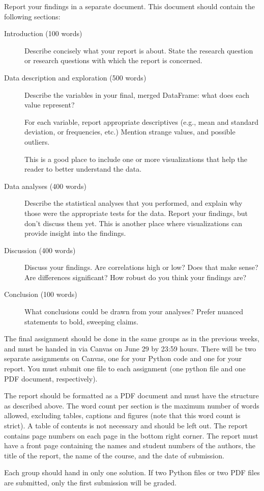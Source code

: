 \documentclass[a4paper]{report}
\theoremstyle{definition}
\newcommand{\blankline}{\par\vspace{5mm}}
\begin{document}
	Report your findings in a separate document. This document should contain
	the following sections:
	
	\begin{description}
		\item[Introduction (100 words)]
		Describe concisely what your report is about. State the research
		question
		or research questions with which the report is concerned.
		
		\item[Data description and exploration (500 words)]
		Describe the variables in your final, merged DataFrame: what does each
		value represent?
		
		For each variable, report appropriate descriptives (e.g., mean and
		standard deviation, or frequencies, etc.) Mention strange values, and
		possible outliers.
		
		This is a good place to include one or more visualizations that help the
		reader to better understand the data.
		
		\item[Data analyses (400 words)]
		
		Describe the statistical analyses that you performed, and explain why
		those were the appropriate tests for the data. Report your findings,
		but don't discuss them yet. This is another place where visualizations can provide insight into the findings.
		
		\item[Discussion (400 words)]
		
		Discuss your findings. Are correlations high or low? Does that make sense? Are differences significant? How robust do you think your findings are?
		
		\item[Conclusion (100 words)]
		
		What conclusions could be drawn from your analyses? Prefer nuanced statements to bold, sweeping claims.
		
	\end{description}
	
	The final assignment should be done in the same groups as in the previous weeks, and must be handed in via Canvas on June 29 by 23:59 hours. There will be two separate assignments on Canvas, one for your Python code and one for your report. You must submit one file to each assignment (one python file and one PDF document, respectively).
	\blankline
	The report should be formatted as a PDF document and must have the structure as described above. The word count per section is the maximum
	number of words allowed, excluding tables, captions and figures (note that this word count is strict). A table of contents is not necessary
	and should be left out. The report contains page numbers on each page in the bottom right corner. The report must have a front page containing
	the names and student numbers of the authors, the title of the report, the name of the course, and the date of submission.
	\blankline
	Each group should hand in only one solution. If two Python files or two 	PDF files are submitted, only the first submission will be graded.
\end{document}
